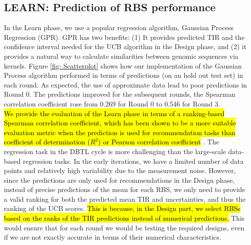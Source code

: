 \documentclass{scrartcl}[2013/05/29]%
\begin{document}
\subsection{LEARN: Prediction of RBS performance}
\label{sec:gp-results}
\label{subsec: results LEARN}

In the Learn phase, we use a popular regression algorithm, Gaussian Process Regression (GPR). GPR has two benefits: (1) It provides predicted TIR and the confidence interval needed for the UCB algorithm in the Design phase, and (2) it provides a natural way to calculate similarities between genomic sequences via kernels.
Figure \ref{fig: Scatterplot} shows how our implementation of the Gaussian Process algorithm performed in terms of predictions (on an hold out test set) in each round. 
As expected, the use of approximate data lead to poor predictions in Round 0.
The predictions improved for the subsequent rounds, the Spearman correlation coefficient rose from 0.269 for Round 0 to 0.546 for Round 3.
\\

\hl{We provide the evaluation of the Learn phase in terms of a ranking-based Spearman correlation coefficient, which has been shown to be a more suitable evaluation metric when the prediction is used for recommendation tasks than coefficient of determination ($R^2$) or Pearson correlation coefficient}
\cite{Schober2018,  Kang2019}.
The regression task in the DBTL cycle is more challenging than the large-scale data-based regression tasks.
In the early iterations, we have a limited number of data points and relatively high variability due to the measurement noise.
However, since the predictions are only used for recommendations in the Design phase, instead of precise predictions of the mean for each RBS, we only need to provide a valid ranking for both the predicted mean TIR and uncertainties, and thus the ranking of the UCB scores.
\hl{
This is because, in the Design part, we select RBSs based on the ranks of the TIR predictions instead of numerical predictions.
}
This would ensure that for each round we would be testing the required designs, even if we are not exactly accurate in terms of their numerical characteristics.
\\
\end{document}
